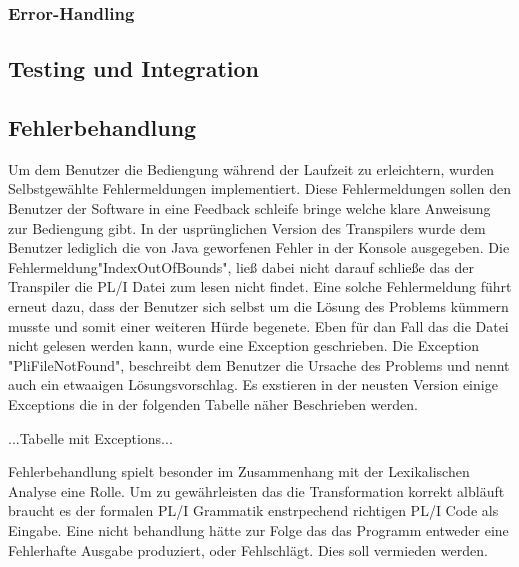 \subsubsection{Error-Handling}

\subsection{Testing und Integration}




\subsection{Fehlerbehandlung}
Um dem Benutzer die Bediengung während der Laufzeit zu erleichtern, wurden Selbstgewählte Fehlermeldungen implementiert. Diese Fehlermeldungen sollen den Benutzer der Software in eine Feedback schleife bringe welche klare Anweisung zur Bediengung gibt. In der usprünglichen Version des Transpilers wurde dem Benutzer lediglich die von Java geworfenen Fehler in der Konsole ausgegeben. Die Fehlermeldung"IndexOutOfBounds", ließ dabei nicht darauf schließe das der Transpiler die PL/I Datei zum lesen nicht findet. Eine solche Fehlermeldung führt erneut dazu, dass der Benutzer sich selbst um die Lösung des Problems kümmern musste und somit einer weiteren Hürde begenete.
Eben für dan Fall das die Datei nicht gelesen werden kann, wurde eine Exception geschrieben. Die Exception "PliFileNotFound", beschreibt dem Benutzer die Ursache des Problems und nennt auch ein etwaaigen Lösungsvorschlag. Es exstieren in der neusten Version einige Exceptions die in der folgenden Tabelle näher Beschrieben werden.

...Tabelle mit Exceptions...

Fehlerbehandlung spielt besonder im Zusammenhang mit der Lexikalischen Analyse eine Rolle. Um zu gewährleisten das die Transformation korrekt albläuft braucht es der formalen PL/I Grammatik enstrpechend richtigen PL/I Code als Eingabe. Eine nicht behandlung hätte zur Folge das das Programm entweder eine Fehlerhafte Ausgabe produziert, oder Fehlschlägt. Dies soll vermieden werden.

